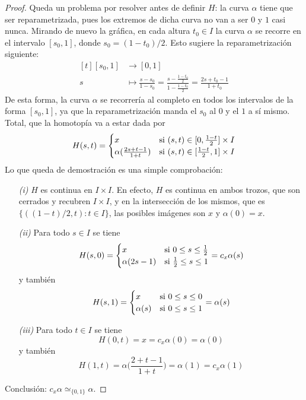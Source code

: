 \documentclass[11pt]{report}
\theoremstyle{definition}
\theoremstyle{definition}
\theoremstyle{remark}
\begin{document}
\begin{proof}
Queda un problema por resolver antes de definir $H$: la curva $\alpha$ tiene que ser reparametrizada, pues los extremos de dicha curva no van a ser $0$ y $1$ casi nunca. Mirando de nuevo la gráfica, en cada altura $t_0 \in I$ la curva $\alpha$ se recorre en el intervalo $[s_0,1]$, donde $s_0 = (1-t_0)/2$. Esto sugiere la reparametrización siguiente:
\[
\begin{aligned}[t]
    [s_0,1] &\longrightarrow [0,1] \\
    s &\longmapsto \frac{s-s_0}{1-s_0} = \frac{s-\frac{1-t_0}{2}}{1-\frac{1-t_0}{2}} = \frac{2s+t_0-1}{1+t_0}
\end{aligned}
\]
De esta forma, la curva $\alpha$ se recorrería al completo en todos los intervalos de la forma $[s_0,1]$, ya que la reparametrización manda el $s_0$ al 0 y el $1$ a sí mismo. Total, que la homotopía va a estar dada por
\[
H(s,t) = \begin{cases}
    x & $si$ \ (s,t) \in [0,\frac{1-t}{2}] \times I\\
    \alpha(\frac{2s+t-1}{1+t}) & $si$ \ (s,t) \in [\frac{1-t}{2},1] \times I
\end{cases}
\]
Lo que queda de demostración es una simple comprobación:
\begin{itemize}
    \item[\textit{(i)}] $H$ es continua en $I \times I$. En efecto, $H$ es continua en ambos trozos, que son cerrados y recubren $I \times I$, y en la intersección de los mismos, que es $\{((1-t)/2,t) \colon t \in I\}$, las posibles imágenes son $x$ y $\alpha(0) = x$.
    \item[\textit{(ii)}] Para todo $s \in I$ se tiene
    \[H(s,0) = \begin{cases}
        x & $si$ \ 0 \leq s \leq \frac{1}{2} \\
        \alpha(2s-1) & $si$ \ \frac{1}{2} \leq s \leq 1
    \end{cases} = c_x\alpha(s)\]
    y también
    \[H(s,1) = \begin{cases}
    x & $si$ \ 0 \leq s \leq 0 \\
    \alpha(s) & $si$ \ 0 \leq s \leq 1
    \end{cases} = \alpha(s)\]
    \item[\textit{(iii)}] Para todo $t \in I$ se tiene
    \[H(0,t) = x = c_x \alpha(0) = \alpha(0)\]
    y también
    \[H(1,t) = \alpha\biggl(\frac{2+t-1}{1+t}\biggr) = \alpha(1) = c_x\alpha(1)\]
\end{itemize}
Conclusión: $c_x\alpha \simeq_{\{0,1\}} \alpha$.
\end{proof}
\end{document}
